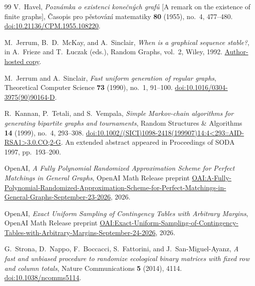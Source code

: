 \begin{thebibliography}{99}
V.~Havel,
\emph{Pozn\'amka o existenci kone\v{c}n\'ych graf\r{u}}
[A remark on the existence of finite graphs],
\v{C}asopis pro p\v{e}stov\'an\'i matematiky
\textbf{80} (1955), no.~4, 477--480.
\href{https://doi.org/10.21136/CPM.1955.108220}{doi:10.21136/CPM.1955.108220}.

M.~Jerrum, B.~D.~McKay, and A.~Sinclair,
\emph{When is a graphical sequence stable?},
in A.~Frieze and T.~\L uczak (eds.), Random Graphs, vol.~2,
Wiley, 1992.
\href{https://users.cecs.anu.edu.au/~bdm/papers/DegSeqStable.pdf}{Author-hosted copy}.

M.~Jerrum and A.~Sinclair,
\emph{Fast uniform generation of regular graphs},
Theoretical Computer Science \textbf{73} (1990), no.~1, 91--100.
\href{https://doi.org/10.1016/0304-3975(90)90164-D}{doi:10.1016/0304-3975(90)90164-D}.

R.~Kannan, P.~Tetali, and S.~Vempala,
\emph{Simple Markov-chain algorithms for generating bipartite graphs and tournaments},
Random Structures \& Algorithms \textbf{14} (1999), no.~4, 293--308.
\href{https://doi.org/10.1002/(SICI)1098-2418(199907)14:4\%3C293::AID-RSA1\%3E3.0.CO;2-G}{doi:10.1002/(SICI)1098-2418(199907)14:4\textless293::AID-RSA1\textgreater3.0.CO;2-G}.
An extended abstract appeared in Proceedings of SODA 1997, pp.~193--200.

OpenAI,
\emph{A Fully Polynomial Randomized Approximation Scheme for Perfect Matchings in General Graphs},
OpenAI Math Release preprint
\href{https://github.com/openai/math/blob/main/preprints/A-Fully-Polynomial-Randomized-Approximation-Scheme-for-Perfect-Matchings-in-General-Graphs-September-23-2026/main.pdf}{OAI:A-Fully-Polynomial-Randomized-Approximation-Scheme-for-Perfect-Matchings-in-General-Graphs-September-23-2026},
2026.

OpenAI,
\emph{Exact Uniform Sampling of Contingency Tables with Arbitrary Margins},
OpenAI Math Release preprint
\href{https://github.com/openai/math/blob/main/preprints/Exact-Uniform-Sampling-of-Contingency-Tables-with-Arbitrary-Margins-September-24-2026/main.pdf}{OAI:Exact-Uniform-Sampling-of-Contingency-Tables-with-Arbitrary-Margins-September-24-2026},
2026.

G.~Strona, D.~Nappo, F.~Boccacci, S.~Fattorini, and J.~San-Miguel-Ayanz,
\emph{A fast and unbiased procedure to randomize ecological binary matrices
with fixed row and column totals},
Nature Communications \textbf{5} (2014), 4114.
\href{https://doi.org/10.1038/ncomms5114}{doi:10.1038/ncomms5114}.


\end{thebibliography}
